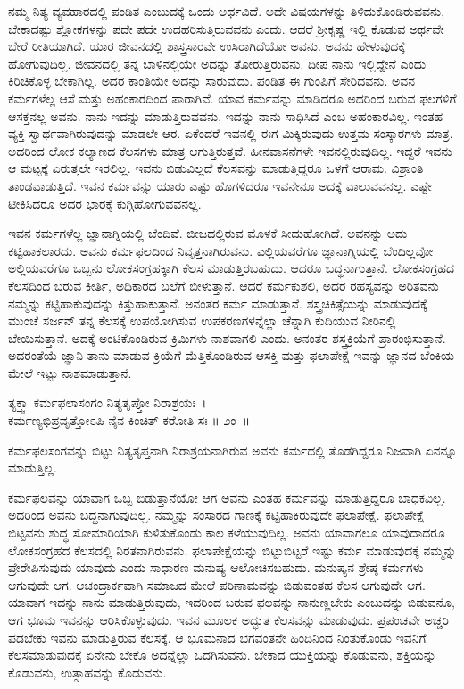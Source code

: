 ನಮ್ಮ ನಿತ್ಯ ವ್ಯವಹಾರದಲ್ಲಿ ಪಂಡಿತ ಎಂಬುದಕ್ಕೆ ಒಂದು ಅರ್ಥವಿದೆ. ಅದೇ ವಿಷಯಗಳನ್ನು ತಿಳಿದುಕೊಂಡಿರುವವನು, ಬೇಕಾದಷ್ಟು ಶ್ಲೋಕಗಳನ್ನು ಪದೇ ಪದೇ ಉದಹರಿಸುತ್ತಿರುವವನು ಎಂದು. ಆದರೆ ಶ‍್ರೀಕೃಷ್ಣ ಇಲ್ಲಿ ಕೊಡುವ ಅರ್ಥವೇ ಬೇರೆ ರೀತಿಯಾಗಿದೆ. ಯಾರ ಜೀವನದಲ್ಲಿ ಶಾಸ್ತ್ರಸಾರವೇ ಉಸಿರಾಗಿದೆಯೋ ಅವನು. ಅವನು ಹೇಳುವುದಕ್ಕೆ ಹೋಗುವುದಿಲ್ಲ. ಜೀವನದಲ್ಲಿ ತನ್ನ ಬಾಳಿನಲ್ಲಿಯೇ ಅದನ್ನು ತೋರುತ್ತಿರುವನು. ದೀಪ ನಾನು ಇಲ್ಲಿದ್ದೇನೆ ಎಂದು ಕಿರಿಚಿಕೊಳ್ಳ ಬೇಕಾಗಿಲ್ಲ. ಅದರ ಕಾಂತಿಯೇ ಅದನ್ನು ಸಾರುವುದು. ಪಂಡಿತ ಈ ಗುಂಪಿಗೆ ಸೇರಿದವನು. ಅವನ ಕರ್ಮಗಳೆಲ್ಲ ಆಸೆ ಮತ್ತು ಅಹಂಕಾರದಿಂದ ಪಾರಾಗಿವೆ. ಯಾವ ಕರ್ಮವನ್ನು ಮಾಡಿದರೂ ಅದರಿಂದ ಬರುವ ಫಲಗಳಿಗೆ ಆಸಕ್ತನಲ್ಲ ಅವನು. ನಾನು ಇದನ್ನು ಮಾಡುತ್ತಿರುವವನು, ಇದನ್ನು ನಾನು ಸಾಧಿಸಿದೆ ಎಂಬ ಅಹಂಕಾರವಿಲ್ಲ. ಇಂತಹ ವ್ಯಕ್ತಿ ಸ್ವಾರ್ಥವಾಗಿರುವುದನ್ನು ಮಾಡಲೇ ಆರ. ಏಕೆಂದರೆ ಇವನಲ್ಲಿ ಈಗ ಮಿಕ್ಕಿರುವುದು ಉತ್ತಮ ಸಂಸ್ಕಾರಗಳು ಮಾತ್ರ. ಅದರಿಂದ ಲೋಕ ಕಲ್ಯಾಣದ ಕೆಲಸಗಳು ಮಾತ್ರ ಆಗುತ್ತಿರುತ್ತವೆ. ಹೀನವಾಸನೆಗಳೇ ಇವನಲ್ಲಿರುವುದಿಲ್ಲ. ಇದ್ದರೆ ಇವನು ಆ ಮಟ್ಟಕ್ಕೆ ಏರುತ್ತಲೇ ಇರಲಿಲ್ಲ. ಇವನು ಬಿಡುವಿಲ್ಲದೆ ಕೆಲಸವನ್ನು ಮಾಡುತ್ತಿದ್ದರೂ ಒಳಗೆ ಆರಾಮ. ವಿಶ್ರಾಂತಿ ತಾಂಡವಾಡುತ್ತಿದೆ. ಇವನ ಕರ್ಮವನ್ನು ಯಾರು ಎಷ್ಟು ಹೊಗಳಿದರೂ ಇವನೇನೂ ಅದಕ್ಕೆ ವಾಲುವವನಲ್ಲ. ಎಷ್ಟೇ ಟೀಕಿಸಿದರೂ ಅದರ ಭಾರಕ್ಕೆ ಕುಗ್ಗಿಹೋಗುವವನಲ್ಲ.

ಇವನ ಕರ್ಮಗಳೆಲ್ಲ ಜ್ಞಾನಾಗ್ನಿಯಲ್ಲಿ ಬೆಂದಿವೆ. ಬೀಜದಲ್ಲಿರುವ ಮೊಳಕೆ ಸೀದುಹೋಗಿದೆ. ಅವನನ್ನು ಅದು ಕಟ್ಟಿಹಾಕಲಾರದು. ಅವನು ಕರ್ಮಫಲದಿಂದ ನಿವೃತ್ತನಾಗಿರುವನು. ಎಲ್ಲಿಯವರೆಗೂ ಜ್ಞಾನಾಗ್ನಿಯಲ್ಲಿ ಬೆಂದಿಲ್ಲವೋ ಅಲ್ಲಿಯವರೆಗೂ ಒಬ್ಬನು ಲೋಕಸಂಗ್ರಹಕ್ಕಾಗಿ ಕೆಲಸ ಮಾಡುತ್ತಿರಬಹುದು. ಆದರೂ ಬದ್ಧನಾಗುತ್ತಾನೆ. ಲೋಕಸಂಗ್ರಹದ ಕೆಲಸದಿಂದ ಬರುವ ಕೀರ್ತಿ, ಅಧಿಕಾರದ ಬಲೆಗೆ ಬೀಳುತ್ತಾನೆ. ಆದರೆ ಕರ್ಮಕುಶಲಿ, ಅದರ ರಹಸ್ಯವನ್ನು ಅರಿತವನು ನಮ್ಮನ್ನು ಕಟ್ಟಿಹಾಕುವುದನ್ನು ಕಿತ್ತುಹಾಕುತ್ತಾನೆ. ಅನಂತರ ಕರ್ಮ ಮಾಡುತ್ತಾನೆ. ಶಸ್ತ್ರಚಿಕಿತ್ಸೆಯನ್ನು ಮಾಡುವುದಕ್ಕೆ ಮುಂಚೆ ಸರ್ಜನ್ ತನ್ನ ಕೆಲಸಕ್ಕೆ ಉಪಯೋಗಿಸುವ ಉಪಕರಣಗಳನ್ನೆಲ್ಲಾ ಚೆನ್ನಾಗಿ ಕುದಿಯುವ ನೀರಿನಲ್ಲಿ ಬೇಯಿಸುತ್ತಾನೆ. ಅದಕ್ಕೆ ಅಂಟಿಕೊಂಡಿರುವ ಕ್ರಿಮಿಗಳು ನಾಶವಾಗಲಿ ಎಂದು. ಅನಂತರ ಶಸ್ತ್ರಕ್ರಿಯೆಗೆ ಪ್ರಾರಂಭಿಸುತ್ತಾನೆ. ಅದರಂತೆಯೆ ಜ್ಞಾನಿ ತಾನು ಮಾಡುವ ಕ್ರಿಯೆಗೆ ಮೆತ್ತಿಕೊಂಡಿರುವ ಆಸಕ್ತಿ ಮತ್ತು ಫಲಾಪೇಕ್ಷೆ ಇವನ್ನು ಜ್ಞಾನದ ಬೆಂಕಿಯ ಮೇಲೆ ಇಟ್ಟು ನಾಶಮಾಡುತ್ತಾನೆ.

\begin{shloka}
ತ್ಯಕ್ತ್ವಾ ಕರ್ಮಫಲಾಸಂಗಂ ನಿತ್ಯತೃಪ್ತೋ ನಿರಾಶ್ರಯಃ~।\\ಕರ್ಮಣ್ಯಭಿಪ್ರವೃತ್ತೋಽಪಿ ನೈನ ಕಿಂಚಿತ್ ಕರೋತಿ ಸಃ \hfill॥ ೨ಂ~॥
\end{shloka}

\begin{artha}
ಕರ್ಮಫಲಸಂಗವನ್ನು ಬಿಟ್ಟು ನಿತ್ಯತೃಪ್ತನಾಗಿ ನಿರಾಶ್ರಯನಾಗಿರುವ ಅವನು ಕರ್ಮದಲ್ಲಿ ತೊಡ\-ಗಿದ್ದರೂ ನಿಜವಾಗಿ ಏನನ್ನೂ ಮಾಡುತ್ತಿಲ್ಲ.
\end{artha}

ಕರ್ಮಫಲವನ್ನು ಯಾವಾಗ ಒಬ್ಬ ಬಿಡುತ್ತಾನೆಯೋ ಆಗ ಅವನು ಎಂತಹ ಕರ್ಮವನ್ನು ಮಾಡುತ್ತಿದ್ದರೂ ಬಾಧಕವಿಲ್ಲ. ಅದರಿಂದ ಅವನು ಬದ್ಧನಾಗುವುದಿಲ್ಲ. ನಮ್ಮನ್ನು ಸಂಸಾರದ ಗಾಣಕ್ಕೆ ಕಟ್ಟಿಹಾಕಿರುವುದೇ ಫಲಾಪೇಕ್ಷೆ. ಫಲಾಪೇಕ್ಷೆ ಬಿಟ್ಟವನು ಶುದ್ಧ ಸೋಮಾರಿಯಾಗಿ ಕುಳಿತುಕೊಂಡು ಕಾಲ ಕಳೆಯುವುದಿಲ್ಲ. ಅವನು ಯಾವಾಗಲೂ ಯಾವುದಾದರೂ ಲೋಕಸಂಗ್ರಹದ ಕೆಲಸದಲ್ಲಿ ನಿರತನಾಗಿರುವನು. ಫಲಾಪೇಕ್ಷೆಯನ್ನು ಬಿಟ್ಟುಬಿಟ್ಟರೆ ಇಷ್ಟು ಕರ್ಮ ಮಾಡುವುದಕ್ಕೆ ನಮ್ಮನ್ನು ಪ್ರೇರೇಪಿಸುವುದು ಯಾವುದು ಎಂದು ಸಾಧಾರಣ ಮನುಷ್ಯ ಆಲೋಚಿಸಬಹುದು. ಮನುಷ್ಯನ ಶ್ರೇಷ್ಠ ಕರ್ಮಗಳು ಆಗುವುದೇ ಆಗ. ಆಚಂದ್ರಾರ್ಕವಾಗಿ ಸಮಾಜದ ಮೇಲೆ ಪರಿಣಾಮವನ್ನು ಬಿಡುವಂತಹ ಕೆಲಸ ಆಗುವುದೇ ಆಗ. ಯಾವಾಗ ಇದನ್ನು ನಾನು ಮಾಡುತ್ತಿರುವುದು, ಇದರಿಂದ ಬರುವ ಫಲವನ್ನು ನಾನುಣ್ಣಬೇಕು ಎಂಬುದನ್ನು ಬಿಡುವನೊ, ಆಗ ಭೂಮ ಇವನನ್ನು ಆರಿಸಿಕೊಳ್ಳುವುದು. ಇವನ ಮೂಲಕ ಅದ್ಭುತ ಕೆಲಸವನ್ನು ಮಾಡುವುದು. ಪ್ರಪಂಚವೇ ಅಚ್ಚರಿ ಪಡಬೇಕು ಇವನು ಮಾಡುತ್ತಿರುವ ಕೆಲಸಕ್ಕೆ. ಆ ಭೂಮನಾದ ಭಗವಂತನೇ ಹಿಂದಿನಿಂದ ನಿಂತುಕೊಂಡು ಇವನಿಗೆ ಕೆಲಸಮಾಡುವುದಕ್ಕೆ ಏನೇನು ಬೇಕೊ ಅದನ್ನೆಲ್ಲಾ ಒದಗಿಸುವನು. ಬೇಕಾದ ಯುಕ್ತಿಯನ್ನು ಕೊಡುವನು, ಶಕ್ತಿಯನ್ನು ಕೊಡುವನು, ಉತ್ಸಾಹವನ್ನು ಕೊಡುವನು.

